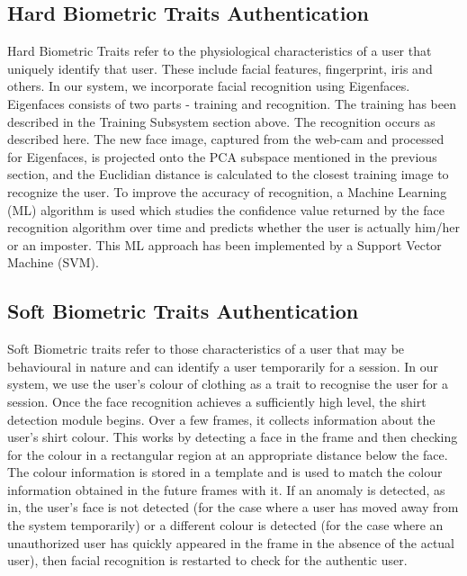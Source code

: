 \documentclass[12pt]{article}			%
\begin{document}
\subsection{Hard Biometric Traits Authentication}
Hard Biometric Traits refer to the physiological characteristics of a user that uniquely identify that user. These include facial features, fingerprint, iris and others. In our system, we incorporate facial recognition using Eigenfaces. Eigenfaces consists of two parts - training and recognition. The training has been described in the Training Subsystem section above. The recognition occurs as described here. The new face image, captured from the web-cam and processed for Eigenfaces, is projected onto the PCA subspace mentioned in the previous section, and the Euclidian distance is calculated to the closest training image to recognize the user. To improve the accuracy of recognition, a Machine Learning (ML) algorithm is used which studies the confidence value returned by the face recognition algorithm over time and predicts whether the user is actually him/her or an imposter. This ML approach has been implemented by a Support Vector Machine (SVM).
   
\subsection{Soft Biometric Traits Authentication}
Soft Biometric traits refer to those characteristics of a user that may be behavioural in nature and can identify a user temporarily for a session. In our system, we use the user's colour of clothing as a trait to recognise the user for a session. Once the face recognition achieves a sufficiently high level, the shirt detection module begins. Over a few frames, it collects information about the user's shirt colour. This works by detecting a face in the frame and then checking for the colour in a rectangular region at an appropriate distance below the face. The colour information is stored in a template and is used to match the colour information obtained in the future frames with it. If an anomaly is detected, as in, the user's face is not detected (for the case where a user has moved away from the system temporarily) or a different colour is detected (for the case where an unauthorized user has quickly appeared in the frame in the absence of the actual user), then facial recognition is restarted to check for the authentic user.
\end{document}
